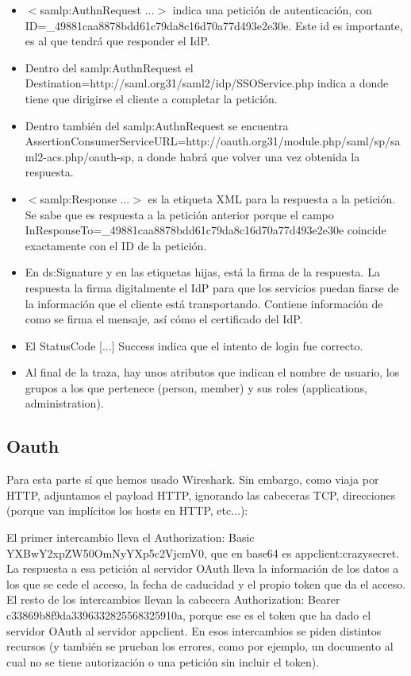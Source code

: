 \documentclass[]{article}
\begin{document}
\begin{itemize}
	\item $<$samlp:AuthnRequest ...$>$ indica una petición de autenticación, con ID=\_49881caa8878bdd61c79da8c16d70a77d493e2e30e. Este id es importante, es al que tendrá que responder el IdP.
	\item Dentro del samlp:AuthnRequest el Destination=http://saml.org31/saml2/idp/SSOService.php indica a donde tiene que dirigirse el cliente a completar la petición.
	\item Dentro también del samlp:AuthnRequest se encuentra AssertionConsumerServiceURL=http://oauth.org31/module.php/saml/sp/saml2-acs.php/oauth-sp, a donde habrá que volver una vez obtenida la respuesta.
	\item $<$samlp:Response ...$>$ es la etiqueta XML para la respuesta a la petición. Se sabe que es respuesta a la petición anterior porque el campo InResponseTo=\_49881caa8878bdd61c79da8c16d70a77d493e2e30e coincide exactamente con el ID de la petición.
	\item En ds:Signature y en las etiquetas hijas, está la firma de la respuesta. La respuesta la firma digitalmente el IdP para que los servicios puedan fiarse de la información que el cliente está transportando. Contiene información de como se firma el mensaje, así cómo el certificado del IdP.
	\item El StatusCode [...] Success indica que el intento de login fue correcto. 
	\item Al final de la traza, hay unos atributos que indican el nombre de usuario, los grupos a los que pertenece (person, member) y sus roles (applications, administration).
\end{itemize}

\subsection{Oauth}

Para esta parte sí que hemos usado Wireshark. Sin embargo, como viaja por HTTP, adjuntamos el payload HTTP, ignorando las cabeceras TCP, direcciones (porque van implícitos los hosts en HTTP, etc...):


El primer intercambio lleva el Authorization: Basic YXBwY2xpZW50OmNyYXp5c2VjcmV0, que en base64 es appclient:crazysecret. La respuesta a esa petición al servidor OAuth lleva la información de los datos a los que se cede el acceso, la fecha de caducidad y el propio token que da el acceso. El resto de los intercambios llevan la cabecera Authorization: Bearer c33869b8f9da3396332825568325910a, porque ese es el token que ha dado el servidor OAuth al servidor appclient. En esos intercambios se piden distintos recursos (y también se prueban los errores, como por ejemplo, un documento al cual no se tiene autorización o una petición sin incluir el token).
\end{document}
